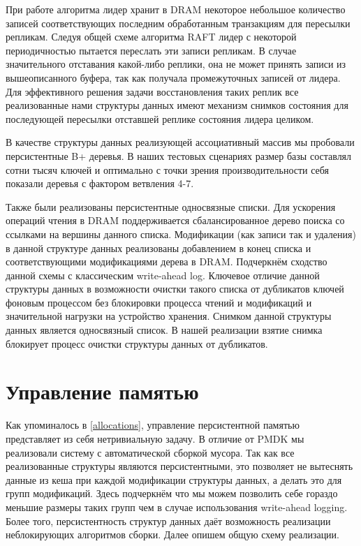 \documentclass[pdftex,ptm,12pt,a4paper]{report}
\theoremstyle{definition}
\begin{document}
При работе алгоритма лидер хранит в DRAM некоторое небольшое количество записей соответствующих последним обработанным транзакциям для пересылки репликам.
Следуя общей схеме алгоритма RAFT лидер с некоторой периодичностью пытается переслать эти записи репликам. В случае значительного отставания какой-либо реплики, она не может
принять записи из вышеописанного буфера, так как получала промежуточных записей от лидера. Для эффективного решения задачи восстановления таких реплик все реализованные нами
структуры данных имеют механизм снимков состояния для последующей пересылки отставшей реплике состояния лидера целиком.

В качестве структуры данных реализующей ассоциативный массив мы пробовали персистентные B+ деревья. В наших тестовых сценариях размер базы составлял сотни тысяч ключей и
оптимально с точки зрения производительности себя показали деревья с фактором ветвления 4-7.

Также были реализованы персистентные односвязные списки. Для ускорения операций чтения в DRAM поддерживается сбалансированное дерево поиска со ссылками на вершины данного списка.
Модификации (как записи так и удаления) в данной структуре данных реализованы добавлением в конец списка и соответствующими модификациями дерева в DRAM.
Подчеркнём сходство данной схемы с классическим write-ahead log. Ключевое отличие данной структуры данных в возможности очистки такого списка от дубликатов ключей фоновым
процессом без блокировки процесса чтений и модификаций и значительной нагрузки на устройство хранения. Снимком данной структуры данных является односвязный список.
В нашей реализации взятие снимка блокирует процесс очистки структуры данных от дубликатов.

\section{Управление памятью}
\label{gc}
Как упоминалось в \ref{allocations}, управление персистентной памятью представляет из себя нетривиальную задачу.
В отличие от PMDK мы реализовали систему с автоматической сборкой мусора. Так как все реализованные структуры являются персистентными, это позволяет не вытеснять данные из кеша
при каждой модификации структуры данных, а делать это для групп модификаций. Здесь подчеркнём что мы можем позволить себе гораздо меньшие размеры
таких групп чем в случае использования write-ahead logging. Более того, персистентность структур данных даёт возможность реализации неблокирующих алгоритмов сборки.
Далее опишем общую схему реализации.
\end{document}
